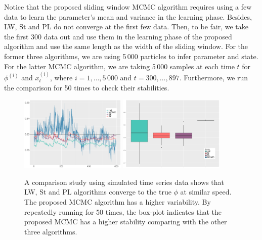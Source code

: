 Notice that the proposed sliding window MCMC algorithm requires using a few data to learn the parameter's mean and variance in the learning phase. Besides, LW, St and PL do not converge at the first few data. Then, to be fair, we take the first 300 data out and use them in the learning phase of the proposed algorithm and use the same length as the width of the sliding window. For the former three algorithms, we are using 5\,000 particles to infer parameter and state. For the latter MCMC algorithm, we are taking 5\,000 samples at each time $t$ for $\phi^{(i)}$ and $x_t^{(i)}$, where $i=1,\ldots,5\,000$ and $t=300,\ldots,897$. Furthermore, we run the comparison for 50 times to check their stabilities. 

\begin{figure}[h]
\centering
\includegraphics[width=0.45\textwidth]{Chapters/04Filtering/plot/ggFilterCompPhi2.pdf}
\includegraphics[width=0.45\textwidth]{Chapters/04Filtering/plot/ggBoxComp.pdf}
\caption{A comparison study using simulated time series data shows that LW, St and PL algorithms converge to the true $\phi$ at similar speed. The proposed MCMC algorithm has a higher variability. By repeatedly running for 50 times, the box-plot indicates that the proposed MCMC has a higher stability comparing with the other three algorithms. } \label{FilterRiewComparesion01}
\end{figure}

